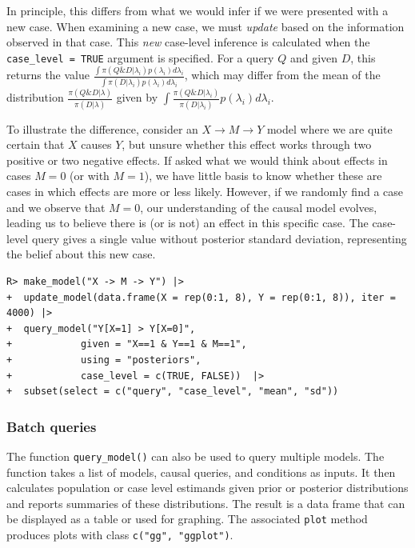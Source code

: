 \documentclass[
  11pt,
  article]{jss}
\begin{document}
In principle, this differs from what we would infer if we were presented
with a new case. When examining a new case, we must \emph{update} based
on the information observed in that case. This \emph{new} case-level
inference is calculated when the \texttt{case\_level\ =\ TRUE} argument
is specified. For a query \(Q\) and given \(D\), this returns the value
\(\frac{\int\pi(Q \& D | \lambda_i)p(\lambda_i)d\lambda_i}{\int\pi(D | \lambda_i)p(\lambda_i)d\lambda_i}\),
which may differ from the mean of the distribution
\(\frac{\pi(Q \& D | \lambda)}{\pi(D | \lambda)}\) given by
\(\int \frac{\pi(Q \& D | \lambda_i)}{\pi(D | \lambda_i)} p(\lambda_i)d\lambda_i\).

To illustrate the difference, consider an
\(X \rightarrow M \rightarrow Y\) model where we are quite certain that
\(X\) causes \(Y\), but unsure whether this effect works through two
positive or two negative effects. If asked what we would think about
effects in cases \(M=0\) (or with \(M=1\)), we have little basis to know
whether these are cases in which effects are more or less likely.
However, if we randomly find a case and we observe that \(M=0\), our
understanding of the causal model evolves, leading us to believe there
is (or is not) an effect in this specific case. The case-level query
gives a single value without posterior standard deviation, representing
the belief about this new case.

\begin{verbatim}
R> make_model("X -> M -> Y") |>
+  update_model(data.frame(X = rep(0:1, 8), Y = rep(0:1, 8)), iter = 4000) |>
+  query_model("Y[X=1] > Y[X=0]", 
+            given = "X==1 & Y==1 & M==1", 
+            using = "posteriors",
+            case_level = c(TRUE, FALSE))  |> 
+  subset(select = c("query", "case_level", "mean", "sd"))
\end{verbatim}

\subsubsection{Batch queries}\label{batch-queries}

The function \texttt{query\_model()} can also be used to query multiple
models. The function takes a list of models, causal queries, and
conditions as inputs. It then calculates population or case level
estimands given prior or posterior distributions and reports summaries
of these distributions. The result is a data frame that can be displayed
as a table or used for graphing. The associated \texttt{plot} method
produces plots with class \texttt{c("gg",\ "ggplot")}.
\end{document}
